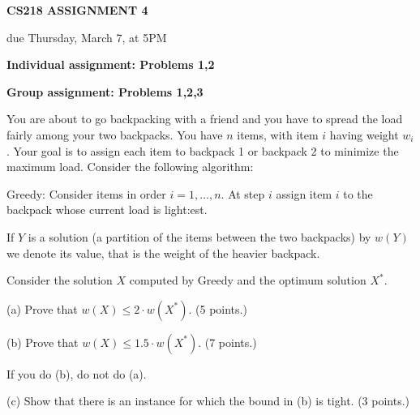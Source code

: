 \documentclass[11pt]{article}
\newcommand{\Greedy}{\mbox{\sc Greedy}}
\begin{document}
\centerline{\large \bf CS218 ASSIGNMENT 4}
\centerline{due Thursday, March 7, at 5PM}

\vskip 0.1in
\noindent
{\bf Individual assignment: Problems 1,2}

\noindent
{\bf Group assignment: Problems 1,2,3}

\vskip 0.1in



\begin{problem}
You are about to go backpacking with a friend and you have to spread the load fairly among your two backpacks. You have $n$ items, with item $i$ having weight $w_i$. Your goal is to assign each item to backpack 1 or backpack 2 to minimize the maximum load. Consider the following algorithm:
%
\begin{description}
\item{{\Greedy}:} Consider items in order $i=1,\dots,n$. At step $i$ assign item $i$ to the backpack whose current load is light:est.
\end{description}
%
If $Y$ is a solution (a partition of the items between the two backpacks) by $w(Y)$ we denote its value, that is the weight of the heavier backpack.

Consider the solution $X$ computed by {\Greedy} and the optimum solution $X^\ast$.

\noindent
(a) Prove that $w(X)\le 2\cdot w(X^\ast)$. (5 points.)

\noindent
(b) Prove that $w(X) \le 1.5\cdot w(X^\ast)$. (7 points.)

If you do (b), do not do (a).

\noindent
(c) Show that there is an instance for which the bound in (b) is tight.
(3 points.) 
\end{problem}
\end{document}
